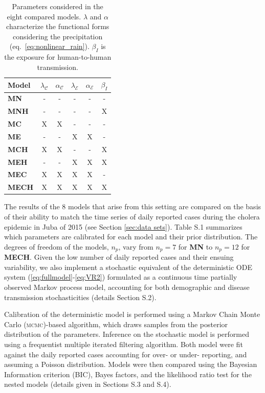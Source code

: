 \begin{table}[h!]
\centering
\begin{tabular}{lccccc}
\toprule
     Model       & $\lambda_{\mathcal{C}}$ & $\alpha_\mathcal{C}$ & $\lambda_{\mathcal{E}}$ & $\alpha_\mathcal{E}$ & $\beta_I$   \\
    \hline
    \textbf{MN} &       -    &    -   &       -      &       -      &  - \\
    \textbf{MNH} &     -      &   -    &    -         &        -     &   X\\
    \textbf{MC} &       X   &   X   &     -        &       -      &  - \\
    \textbf{ME} &         -  &   -    &       X     &    X         & -  \\
    \textbf{MCH}&       X   &   X   &      -       &     -        & X  \\
    \textbf{MEH}&        -   &  -     &       X     &    X         & X  \\
    \textbf{MEC}&       X  &   X   &       X     &     X       & -\\
    \textbf{MECH}&       X  &   X   &       X     &     X        &   X\\
\bottomrule
\end{tabular}
\caption{Parameters considered in the eight compared models.  $\lambda$ and $\alpha$ characterize the functional forms considering the precipitation (eq.~\ref{eq:nonlinear_rain}). $\beta_I$ is the exposure for human-to-human transmission.}
\label{tab:models}
\end{table}

The results of the 8 models that arise from this setting are compared on the basis of their ability to match the time series of daily reported cases during the cholera epidemic in Juba of 2015 (see Section \ref{sec:data sets}). Table S.1 summarizes which parameters are calibrated for each model and their prior distribution. The degrees of freedom of the models, $n_p$, vary from $n_p=7$ for \textbf{MN} to $n_p=12$ for \textbf{MECH}. Given the low number of daily reported cases and their ensuing variability, we also implement a stochastic equivalent of the deterministic ODE system (\ref{eq:fullmodel}-\ref{eq:VR2}) formulated as a continuous time partially observed Markov process model, accounting for both demographic and disease transmission stochasticities \cite{Breto2009} (details Section S.2). 

Calibration of the deterministic model is performed using a Markov Chain Monte Carlo (\textsc{mcmc})-based algorithm, which draws samples from the posterior distribution of the parameters. Inference on the stochastic model is performed using a frequentist multiple iterated filtering algorithm. Both model were fit against the daily reported cases accounting for over- or under- reporting, and assuming a Poisson distribution. Models were then compared using the Bayesian Information criterion (BIC), Bayes factors, and the likelihood ratio test for the nested models (details given in Sections S.3 and S.4).

